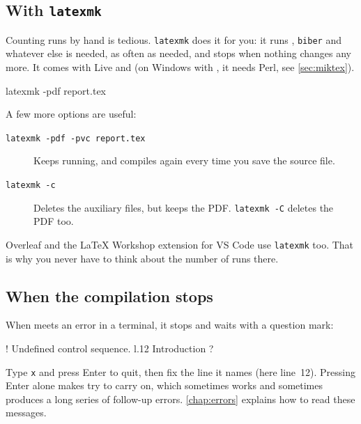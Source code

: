 \subsection{With \texttt{latexmk}}\label{sec:latexmk}

Counting runs by hand is tedious.
\texttt{latexmk} does it for you:
it runs , \texttt{biber} and whatever else is needed,
as often as needed, and stops when nothing changes any more.
It comes with  Live and 
(on Windows with , it needs Perl, see \autoref{sec:miktex}).

\begin{codeblock}[style=shell]
latexmk -pdf report.tex
\end{codeblock}

A few more options are useful:

\begin{description}
    \item[\texttt{latexmk -pdf -pvc report.tex}]
        Keeps running, and compiles again every time you save the source file.
    \item[\texttt{latexmk -c}]
        Deletes the auxiliary files, but keeps the PDF.
        \texttt{latexmk -C} deletes the PDF too.
\end{description}

Overleaf and the LaTeX Workshop extension for VS Code use \texttt{latexmk} too.
That is why you never have to think about the number of runs there.

\subsection{When the compilation stops}

When  meets an error in a terminal, it stops and waits with a question mark:

\begin{codeblock}[style=shell]
! Undefined control sequence.
l.12 \sectoin
             {Introduction}
?
\end{codeblock}

Type \texttt{x} and press Enter to quit, then fix the line it names (here line~12).
Pressing Enter alone makes  try to carry on,
which sometimes works and sometimes produces a long series of follow-up errors.
\autoref{chap:errors} explains how to read these messages.
